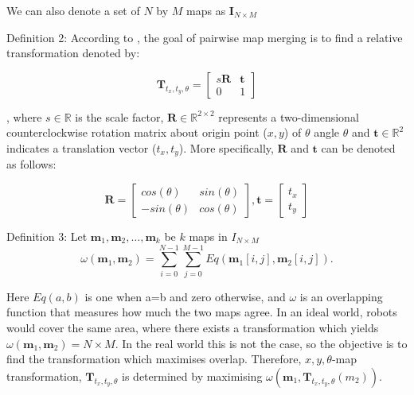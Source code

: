 We can also denote a set of $N$ by $M$ maps as $\mathbf{I}_{N \times M}$


Definition 2:  According to \cite{Carpin2008b}, the goal of pairwise map merging is to find a relative transformation denoted by:

\begin{equation}
    \mathbf{T}_{t_x,t_y,\theta} = \begin{bmatrix}
            s\mathbf{R} & \mathbf{t}\\
            0 & 1
        \end{bmatrix}
        \label{eq:transformation}
\end{equation}

, where $s \in \mathbb{R}$ is the scale factor, $\mathbf{R} \in \mathbb{R}^{2\times2}$ represents a two-dimensional counterclockwise rotation matrix about origin point ($x,y$) of $\theta$ angle $\theta$ and $\mathbf{t} \in \mathbb{R}^2$ indicates a translation vector ($t_x, t_y$). More specifically, $\mathbf{R}$ and $\mathbf{t}$ can be denoted as follows:

\begin{equation}
    \mathbf{R} =  \begin{bmatrix}
        cos(\theta) & sin(\theta)\\
        -sin(\theta) & cos(\theta)
        \end{bmatrix},
    \mathbf{t} = \begin{bmatrix}
        t_x\\
        t_y
        \end{bmatrix}
\end{equation}

Definition 3:  
Let $\mathbf{m}_1, \mathbf{m}_2, \dots, \mathbf{m}_k$ be $k$ maps in $I_{N \times M}$
\begin{equation}
    \omega(\mathbf{m}_1, \mathbf{m}_2) = \sum_{i=0}^{N-1}\sum_{j=0}^{M-1} Eq(\mathbf{m}_1[i,j], \mathbf{m}_2[i,j]).
\end{equation}

Here $Eq(a,b)$ is one when a=b and zero otherwise, and $\omega$ is an overlapping function that measures how much the two maps agree. In an ideal world, robots would cover the same area, where there exists a transformation which yields $ \omega(\mathbf{m}_1, \mathbf{m}_2) = N \times M$. In the real world this is not the case, so the objective is to find the transformation which maximises overlap. Therefore, ${x, y, \theta}$-map transformation, $\mathbf{T}_{t_x,t_y,\theta}$ is determined by maximising $ \omega(\mathbf{m}_1, \mathbf{T}_{t_x,t_y,\theta}(m_2))$.

